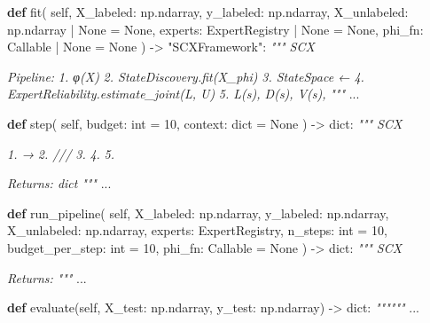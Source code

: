 \documentclass[
  12pt,
]{article}
\newenvironment{Shaded}{}{}
\newcommand{\BuiltInTok}[1]{\textcolor[rgb]{0.00,0.50,0.00}{#1}}
\newcommand{\CommentTok}[1]{\textcolor[rgb]{0.38,0.63,0.69}{\textit{#1}}}
\newcommand{\DecValTok}[1]{\textcolor[rgb]{0.25,0.63,0.44}{#1}}
\newcommand{\KeywordTok}[1]{\textcolor[rgb]{0.00,0.44,0.13}{\textbf{#1}}}
\newcommand{\NormalTok}[1]{#1}
\newcommand{\OperatorTok}[1]{\textcolor[rgb]{0.40,0.40,0.40}{#1}}
\newcommand{\StringTok}[1]{\textcolor[rgb]{0.25,0.44,0.63}{#1}}
\newcommand{\VariableTok}[1]{\textcolor[rgb]{0.10,0.09,0.49}{#1}}
\begin{document}
\begin{Shaded}
\begin{Highlighting}[]
    \KeywordTok{def}\NormalTok{ fit(}
        \VariableTok{self}\NormalTok{,}
\NormalTok{        X\_labeled: np.ndarray,}
\NormalTok{        y\_labeled: np.ndarray,}
\NormalTok{        X\_unlabeled: np.ndarray }\OperatorTok{|} \VariableTok{None} \OperatorTok{=} \VariableTok{None}\NormalTok{,}
\NormalTok{        experts: ExpertRegistry }\OperatorTok{|} \VariableTok{None} \OperatorTok{=} \VariableTok{None}\NormalTok{,}
\NormalTok{        phi\_fn: Callable }\OperatorTok{|} \VariableTok{None} \OperatorTok{=} \VariableTok{None}
\NormalTok{    ) }\OperatorTok{{-}\textgreater{}} \StringTok{"SCXFramework"}\NormalTok{:}
        \CommentTok{""" SCX }

\CommentTok{        Pipeline:}
\CommentTok{        1.  φ(X) }
\CommentTok{        2. StateDiscovery.fit(X\_phi)}
\CommentTok{        3. StateSpace ← }
\CommentTok{        4. ExpertReliability.estimate\_joint(L, U)}
\CommentTok{        5.  L(s), D(s), V(s), }
\CommentTok{        """}
\NormalTok{        ...}

    \KeywordTok{def}\NormalTok{ step(}
        \VariableTok{self}\NormalTok{,}
\NormalTok{        budget: }\BuiltInTok{int} \OperatorTok{=} \DecValTok{10}\NormalTok{,}
\NormalTok{        context: }\BuiltInTok{dict} \OperatorTok{=} \VariableTok{None}
\NormalTok{    ) }\OperatorTok{{-}\textgreater{}} \BuiltInTok{dict}\NormalTok{:}
        \CommentTok{""" SCX }

\CommentTok{        1.  → }
\CommentTok{        2. ///}
\CommentTok{        3. }
\CommentTok{        4. }
\CommentTok{        5. }

\CommentTok{        Returns: dict }
\CommentTok{        """}
\NormalTok{        ...}

    \KeywordTok{def}\NormalTok{ run\_pipeline(}
        \VariableTok{self}\NormalTok{,}
\NormalTok{        X\_labeled: np.ndarray,}
\NormalTok{        y\_labeled: np.ndarray,}
\NormalTok{        X\_unlabeled: np.ndarray,}
\NormalTok{        experts: ExpertRegistry,}
\NormalTok{        n\_steps: }\BuiltInTok{int} \OperatorTok{=} \DecValTok{10}\NormalTok{,}
\NormalTok{        budget\_per\_step: }\BuiltInTok{int} \OperatorTok{=} \DecValTok{10}\NormalTok{,}
\NormalTok{        phi\_fn: Callable }\OperatorTok{=} \VariableTok{None}
\NormalTok{    ) }\OperatorTok{{-}\textgreater{}} \BuiltInTok{dict}\NormalTok{:}
        \CommentTok{""" SCX }

\CommentTok{        Returns: }
\CommentTok{        """}
\NormalTok{        ...}

    \KeywordTok{def}\NormalTok{ evaluate(}\VariableTok{self}\NormalTok{, X\_test: np.ndarray, y\_test: np.ndarray) }\OperatorTok{{-}\textgreater{}} \BuiltInTok{dict}\NormalTok{:}
        \CommentTok{""""""}
\NormalTok{        ...}


\end{Highlighting}
\end{Shaded}
\end{document}
